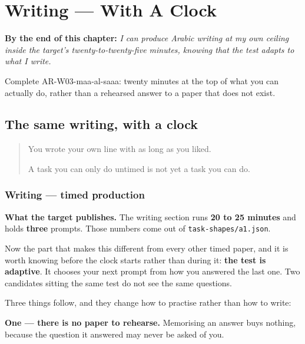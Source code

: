 
\chapter{Writing --- With A Clock}
\label{ch:ar-maa-al-saaa}

\begin{chapteropening}
\textbf{By the end of this chapter:} \emph{I can produce Arabic writing at my own ceiling inside the target's twenty-to-twenty-five minutes, knowing that the test adapts to what I write.}

Complete AR-W03-maa-al-saaa: twenty minutes at the top of what you can actually do, rather than a rehearsed answer to a paper that does not exist.
\end{chapteropening}

\section[(with a clock)]{The same writing, with a clock}

\label{lesson:AR-W03-maa-al-saaa}



\begin{quote}
You wrote your own line with as long as you liked.

A task you can only do untimed is not yet a task you can do.
\end{quote}

\subsection*{Writing — timed production}
\textbf{What the target publishes.} The writing section runs \textbf{20 to 25 minutes} and holds \textbf{three} prompts. Those numbers come out of \texttt{task-shapes/a1.json}.

Now the part that makes this different from every other timed paper, and it is worth knowing before the clock starts rather than during it: \textbf{the test is adaptive}. It chooses your next prompt from how you answered the last one. Two candidates sitting the same test do not see the same questions.

Three things follow, and they change how to practise rather than how to write:

\textbf{One — there is no paper to rehearse.} Memorising an answer buys nothing, because the question it answered may never be asked of you.

